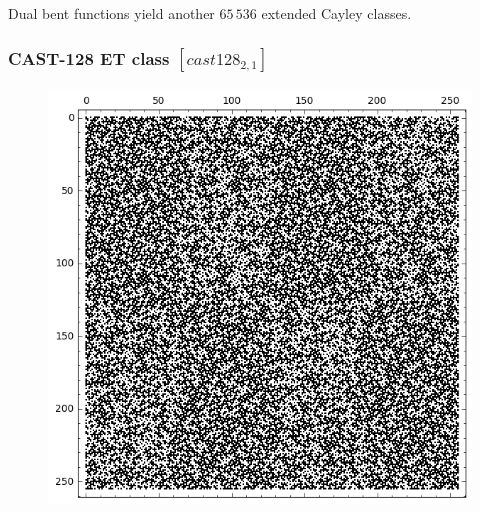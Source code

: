 \documentclass[pdf,sprung,slideColor,nocolorBG]{beamer}
\newenvironment{colortheme}[1]{
\def\ProvidesPackageRCS $##1${\relax}
\renewcommand{\ProcessOptions}{\relax}
\makeatletter

\makeatother
}{}
\begin{document}
\begin{colortheme}{jubata}
\begin{frame}
\begin{figure}
\begin{minipage}{.48\textwidth}
  \label{fig:cast128_1_0_bent_cayley_graph_index_matrix}
\end{minipage}%
\end{figure}
Dual bent functions yield another $65\,536$ extended Cayley classes.
\end{frame}
\begin{frame}
\frametitle{CAST-128 ET class $[cast128_{2,1}]$}
\begin{figure}
\centering
\begin{minipage}{.48\textwidth}
  \centering

\includegraphics[width=.9\linewidth]{../matrix_plot/cast128_2_1_weight_class_matrix.png}
  \label{fig:cast128_2_1_weight_class_matrix}
\end{minipage}
\begin{minipage}{.48\textwidth}
  \centering

\end{minipage}
\end{figure}
\end{frame}
\end{colortheme}
\end{document}

